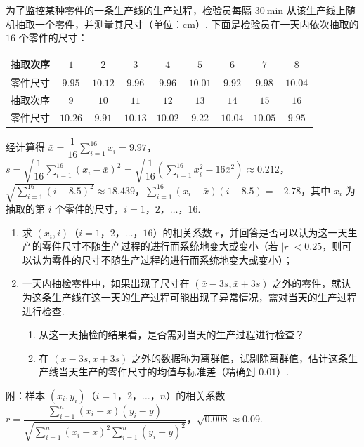 \begin{problem}
为了监控某种零件的一条生产线的生产过程，检验员每隔 \(30 \mathrm{~min}\) 从该生产线上随机抽取一个零件，并测量其尺寸（单位：\(\mathrm{cm}\)）. 下面是检验员在一天内依次抽取的 \(16\) 个零件的尺寸：

\begin{center}
\begin{tabular}{c|cccccccc}
抽取次序 & \(1\) & \(2\) & \(3\) & \(4\) & \(5\) & \(6\) & \(7\) & \(8\) \\
\hline
零件尺寸 & \(9.95\) & \(10.12\) & \(9.96\) & \(9.96\) & \(10.01\) & \(9.92\) & \(9.98\) & \(10.04\) \\
\hline
抽取次序 & \(9\) & \(10\) & \(11\) & \(12\) & \(13\) & \(14\) & \(15\) & \(16\) \\
\hline
零件尺寸 & \(10.26\) & \(9.91\) & \(10.13\) & \(10.02\) & \(9.22\) & \(10.04\) & \(10.05\) & \(9.95\) \\
\hline
\end{tabular}
\end{center}

经计算得 \(\bar x=\dfrac{1}{16}\sum_{i=1}^{16}x_i=9.97\)，\(s=\sqrt{\dfrac{1}{16}\sum_{i=1}^{16}(x_i-\bar x)^2}=\sqrt{\dfrac{1}{16}\left(\sum_{i=1}^{16}x_i^2-16\bar x^2\right)}\approx0.212\)，\(\sqrt{\sum_{i=1}^{16}(i-8.5)^2}\approx18.439\)，\(\sum_{i=1}^{16}(x_i-\bar x)(i-8.5)=-2.78\)，其中 \(x_i\) 为抽取的第 \(i\) 个零件的尺寸，\(i=1\)，\(2\)，\(\dots\)，\(16\).

\begin{enumerate}
\item 求 \((x_i,i)\)（\(i=1\)，\(2\)，\(\dots\)，\(16\)）的相关系数 \(r\)，并回答是否可以认为这一天生产的零件尺寸不随生产过程的进行而系统地变大或变小（若 \(|r|<0.25\)，则可以认为零件的尺寸不随生产过程的进行而系统地变大或变小）；
\item 一天内抽检零件中，如果出现了尺寸在 \((\bar x-3s,\bar x+3s)\) 之外的零件，就认为这条生产线在这一天的生产过程可能出现了异常情况，需对当天的生产过程进行检查.

\begin{enumerate}
\item 从这一天抽检的结果看，是否需对当天的生产过程进行检查？
\item 在 \((\bar x-3s,\bar x+3s)\) 之外的数据称为离群值，试剔除离群值，估计这条生产线当天生产的零件尺寸的均值与标准差（精确到 \(0.01\)）.
\end{enumerate}
\end{enumerate}

附：样本 \((x_i,y_i)\)（\(i=1\)，\(2\)，\(\dots\)，\(n\)）的相关系数
\(r=\dfrac{\sum_{i=1}^{n}(x_i-\bar x)(y_i-\bar y)}{\sqrt{\sum_{i=1}^{n}(x_i-\bar x)^2\sum_{i=1}^{n}(y_i-\bar y)^2}}\)，\(\sqrt{0.008}\approx0.09\).
\end{problem}

